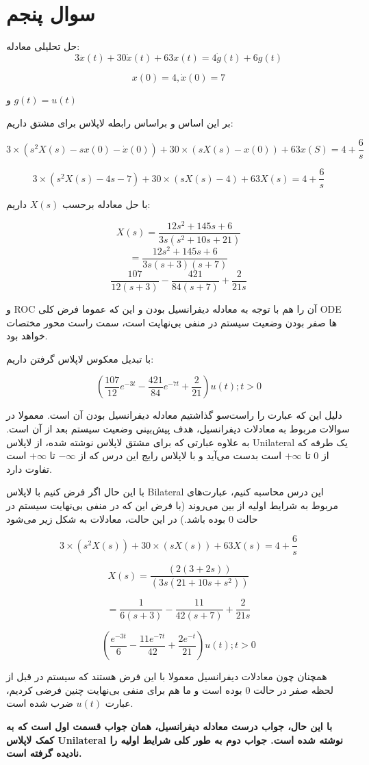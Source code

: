 \documentclass[12pt]{article}
\begin{document}
\section{سوال پنجم}

حل تحلیلی معادله:
$$
3 \ddot{x}(t)+30 \dot{x}(t)+63 x(t)=4 \dot{g}(t)+6 g(t)
$$

$$
x(0)=4, \dot{x}(0)=7
$$

و $g(t)=u(t)$

بر این اساس و براساس رابطه لاپلاس برای مشتق داریم:

$$3 \times (s^2X(s) - sx(0) - \dot{x}(0)) + 30 \times (sX(s)-x(0)) + 63 x(S) = 4 + \frac{6}{s}$$


$$3 \times (s^2X(s) - 4s - 7) + 30 \times (sX(s)-4) + 63 X(s) = 4 + \frac{6}{s}$$

با حل معادله برحسب $X(s)$ داریم:

$$
X(s)=\frac{12 s^{2}+145 s+6}{3 s\left(s^{2}+10 s+21\right)}
$$
$$
=\frac{12 s^{2}+145 s+6}{3 s(s+3)(s+7)}
$$
$$
\frac{107}{12 (s+3)}-\frac{421}{84 (s+7)}+\frac{2}{21 s}
$$

و ROC آن را هم با توجه به معادله دیفرانسیل بودن و این که عموما فرض کلی ODE ها صفر بودن وضعیت سیستم در منفی‌ بی‌نهایت است، سمت راست محور مختصات خواهد بود.

با تبدیل معکوس لاپلاس گرفتن داریم:

$$(\frac{107}{12} e^{-3t} - \frac{421}{84}e^{-7t} + \frac{2}{21})u(t) ; t>0$$

دلیل این که عبارت را راست‌سو گذاشتیم معادله دیفرانسیل بودن آن است. معمولا در سوالات مربوط به معادلات دیفرانسیل، هدف پیش‌بینی وضعیت سیستم بعد از آن است. به علاوه عبارتی که برای مشتق لاپلاس نوشته شده، از لاپلاس Unilateral یک طرفه که از $0$ تا $+\infty$ است بدست می‌آید و با لاپلاس رایج این درس که از $-\infty$ تا $+\infty$ است تفاوت دارد.

با این حال اگر فرض کنیم با لاپلاس Bilateral این درس محاسبه کنیم، عبارت‌های مربوط به شرایط اولیه از بین می‌روند (با فرض این که در منفی بی‌نهایت سیستم در حالت $0$ بوده باشد.) در این حالت،  معادلات به شکل زیر می‌شود



$$3 \times (s^2X(s)) + 30 \times (sX(s)) + 63 X(s) = 4 + \frac{6}{s}$$

$$X(s)= \frac{(2 (3 + 2 s))}{(3 s (21 + 10 s + s^2))}$$

$$= \frac{1}{6 (s+3)}-\frac{11}{42 (s+7)}+\frac{2}{21 s}$$


$$(\frac{e^{-3t}}{6} - \frac{11 e^{-7t}}{42} + \frac{2 e^{-t}}{21})u(t) ; t>0$$

همچنان چون معادلات دیفرانسیل معمولا با این فرض هستند که سیستم در قبل از لحظه صفر در حالت $0$ بوده است و ما هم برای منفی بی‌نهایت چنین فرضی کردیم، عبارت‌ $u(t)$ ضرب شده است.

\textbf{با این حال، جواب درست معادله دیفرانسیل، همان جواب قسمت اول است که به کمک لاپلاس Unilateral نوشته شده است. جواب دوم به طور کلی شرایط اولیه را نادیده گرفته است.}
\end{document}
